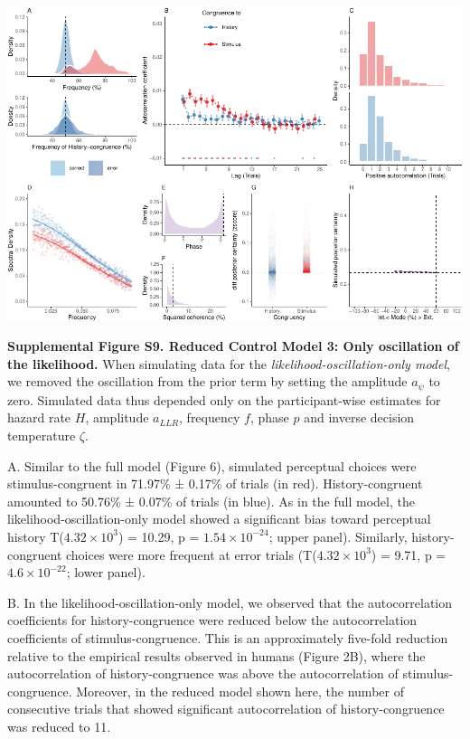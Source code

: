 \documentclass[
]{article}
\begin{document}
\includegraphics{modes_mouse_files/figure-latex/Supplemental_Figure_S9-1.pdf}

\textbf{Supplemental Figure S9. Reduced Control Model 3: Only
oscillation of the likelihood.} When simulating data for the
\emph{likelihood-oscillation-only model}, we removed the oscillation
from the prior term by setting the amplitude \(a_{\psi}\) to zero.
Simulated data thus depended only on the participant-wise estimates for
hazard rate \(H\), amplitude \(a_{LLR}\), frequency \(f\), phase \(p\)
and inverse decision temperature \(\zeta\).

A. Similar to the full model (Figure 6), simulated perceptual choices
were stimulus-congruent in 71.97\% ± 0.17\% of trials (in red).
History-congruent amounted to 50.76\% ± 0.07\% of trials (in blue). As
in the full model, the likelihood-oscillation-only model showed a
significant bias toward perceptual history
T(\ensuremath{4.32\times 10^{3}}) = 10.29, p =
\(\ensuremath{1.54\times 10^{-24}}\); upper panel). Similarly,
history-congruent choices were more frequent at error trials
(T(\ensuremath{4.32\times 10^{3}}) = 9.71, p =
\(\ensuremath{4.6\times 10^{-22}}\); lower panel).

B. In the likelihood-oscillation-only model, we observed that the
autocorrelation coefficients for history-congruence were reduced below
the autocorrelation coefficients of stimulus-congruence. This is an
approximately five-fold reduction relative to the empirical results
observed in humans (Figure 2B), where the autocorrelation of
history-congruence was above the autocorrelation of stimulus-congruence.
Moreover, in the reduced model shown here, the number of consecutive
trials that showed significant autocorrelation of history-congruence was
reduced to 11.
\end{document}
